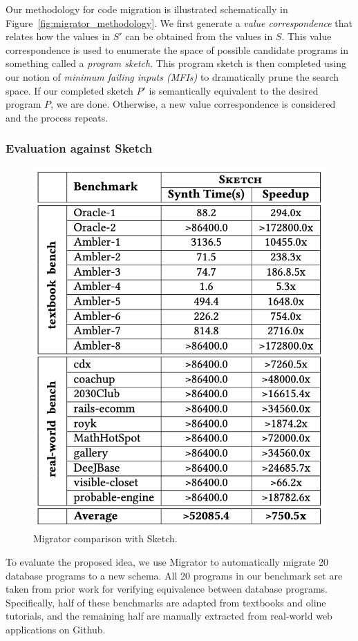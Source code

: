 \documentclass[]{article}
\begin{document}
                Our methodology for code migration is illustrated schematically in Figure~\ref{fig:migrator_methodology}. We first generate a \textit{value correspondence} that relates how the values in $S'$ can be obtained from the values in $S$. This value correspondence is used to enumerate the space of possible candidate programs in something called a \textit{program sketch}. This program sketch is then completed using our notion of \textit{minimum failing inputs (MFIs)} to dramatically prune the search space. If our completed sketch $P'$ is semantically equivalent to the desired program $P$, we are done. Otherwise, a new value correspondence is considered and the process repeats. 
            
            \subsubsection{Evaluation against Sketch}

                \begin{figure}[!t]
                    \centering
                    \includegraphics[width=.6\textwidth]{migrator_sketch_results}
                    \caption{Migrator comparison with Sketch.}
                    \label{fig:migrator_sketch_results}
                \end{figure}

                To evaluate the proposed idea, we use Migrator to automatically migrate 20 database programs to a new schema. All 20 programs in our benchmark set are taken from prior work \cite{wang2017verifying} for verifying equivalence between database programs. Specifically, half of these benchmarks are adapted from textbooks and oline tutorials, and the remaining half are manually extracted from real-world web applications on Github. 
\end{document}
